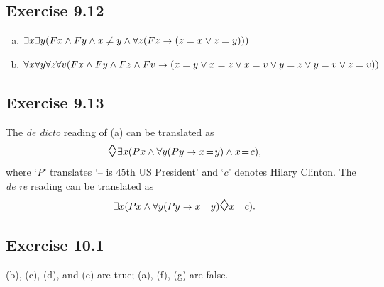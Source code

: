 \documentclass{scrartcl}
\let\olddiamond\Diamond
\renewcommand\Diamond{\scaleobj{1.2}{\olddiamond}}
\let\oldto\to
\renewcommand\to{\scaleobj{0.95}{\,\oldto\,}}
\begin{document}
  \subsection*{Exercise 9.12}

%
%
  \begin{enumerate}[(a)]
  \item $\exists x \exists y(Fx \land Fy \land x\not=y \land \forall z(Fz \to (z=x \lor z=y)))$
  \item $\forall x \forall y\forall z\forall v(Fx \land Fy \land Fz \land Fv \to (x=y \lor x=z \lor x=v \lor y=z \lor y=v \lor z=v))$
  \end{enumerate}


  \subsection*{Exercise 9.13}

%
%
  The \emph{de dicto} reading of (a) can be translated as
  \begin{equation*}
    \Diamond \exists x (Px \land \forall y(Py \to x\!=\!y) \land x\!=\!c),%
  \end{equation*}
  where `$P$' translates `-- is 45th US President' and `$c$' denotes Hilary
  Clinton. The \emph{de re} reading can be translated as
  \begin{equation*}
    \exists x (Px \land \forall y(Py \to x\!=\!y) \Diamond x\!=\!c).
  \end{equation*}

  \subsection*{Exercise 10.1}

%
%
  (b), (c), (d), and (e) are true; (a), (f), (g) are false.
\end{document}
